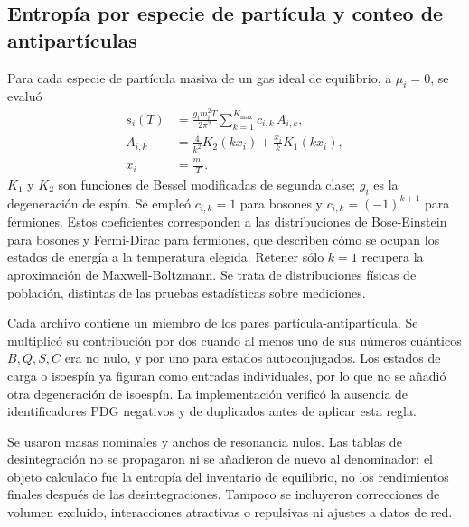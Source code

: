 \subsection{Entropía por especie de partícula y conteo de antipartículas}
Para cada especie de partícula masiva de un gas ideal de equilibrio, a $\mu_i=0$, se evaluó
\begin{align}
s_i(T)&=\frac{g_i m_i^2T}{2\pi^2}
\sum_{k=1}^{K_{\max}}c_{i,k}\,A_{i,k},\label{eq:entropy}\\
A_{i,k}&=\frac{4}{k^2}K_2(kx_i)+\frac{x_i}{k}K_1(kx_i),\\
x_i&=\frac{m_i}{T}.\nonumber
\end{align}
$K_1$ y $K_2$ son funciones de Bessel modificadas de segunda clase; $g_i$ es la degeneración de espín. Se empleó $c_{i,k}=1$ para bosones y $c_{i,k}=(-1)^{k+1}$ para fermiones. Estos coeficientes corresponden a las distribuciones de Bose-Einstein para bosones y Fermi-Dirac para fermiones, que describen cómo se ocupan los estados de energía a la temperatura elegida. Retener sólo $k=1$ recupera la aproximación de Maxwell-Boltzmann. Se trata de distribuciones físicas de población, distintas de las pruebas estadísticas sobre mediciones.

Cada archivo contiene un miembro de los pares partícula-antipartícula. Se multiplicó su contribución por dos cuando al menos uno de sus números cuánticos $B,Q,S,C$ era no nulo, y por uno para estados autoconjugados. Los estados de carga o isoespín ya figuran como entradas individuales, por lo que no se añadió otra degeneración de isoespín. La implementación verificó la ausencia de identificadores PDG negativos y de duplicados antes de aplicar esta regla.

Se usaron masas nominales y anchos de resonancia nulos. Las tablas de desintegración no se propagaron ni se añadieron de nuevo al denominador: el objeto calculado fue la entropía del inventario de equilibrio, no los rendimientos finales después de las desintegraciones. Tampoco se incluyeron correcciones de volumen excluido, interacciones atractivas o repulsivas ni ajustes a datos de red.

